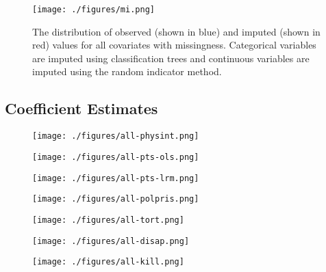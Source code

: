 \documentclass[12pt]{article}
\begin{document}
\begin{figure}[!htpb]
\centering
\texttt{[image: ./figures/mi.png]}
\caption{The distribution of observed (shown in blue) and imputed (shown in red) values for all covariates with missingness. Categorical variables are imputed using classification trees and continuous variables are imputed using the random indicator method.}
\label{fig:mi}
\end{figure}

\subsection{Coefficient Estimates}

\begin{figure}[!htpb]
\centering
\texttt{[image: ./figures/all-physint.png]}
\caption{}
\label{fig:all-physint}
\end{figure}

\begin{figure}[!htpb]
\centering
\texttt{[image: ./figures/all-pts-ols.png]}
\caption{}
\label{fig:all-pts-ols}
\end{figure}

\begin{figure}[!htpb]
\centering
\texttt{[image: ./figures/all-pts-lrm.png]}
\caption{}
\label{fig:all-pts-lrm}
\end{figure}

\begin{figure}[!htpb]
\centering
\texttt{[image: ./figures/all-polpris.png]}
\caption{}
\label{fig:all-polpris}
\end{figure}

\begin{figure}[!htpb]
\centering
\texttt{[image: ./figures/all-tort.png]}
\caption{}
\label{fig:all-tort}
\end{figure}

\begin{figure}[!htpb]
\centering
\texttt{[image: ./figures/all-disap.png]}
\caption{}
\label{fig:all-disap}
\end{figure}

\begin{figure}[!htpb]
\centering
\texttt{[image: ./figures/all-kill.png]}
\caption{}
\label{fig:all-kill}
\end{figure}
\end{document}
